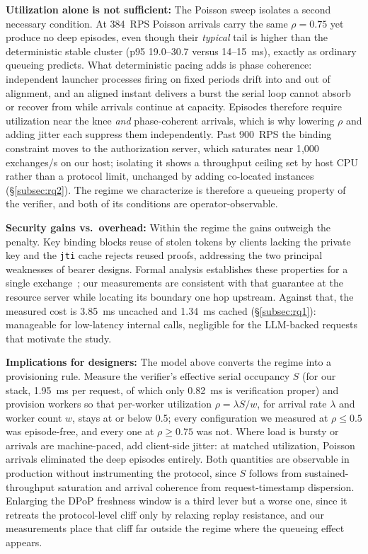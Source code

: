 \documentclass[conference]{IEEEtran}
\begin{document}
\textbf{Utilization alone is not sufficient:}
The Poisson sweep isolates a second necessary condition. At 384~RPS Poisson arrivals carry the same $\rho = 0.75$ yet produce no deep episodes, even though their \emph{typical} tail is higher than the deterministic stable cluster (p95 19.0--30.7 versus 14--15~ms), exactly as ordinary queueing predicts. What deterministic pacing adds is phase coherence: independent launcher processes firing on fixed periods drift into and out of alignment, and an aligned instant delivers a burst the serial loop cannot absorb or recover from while arrivals continue at capacity. Episodes therefore require utilization near the knee \emph{and} phase-coherent arrivals, which is why lowering $\rho$ and adding jitter each suppress them independently. Past 900~RPS the binding constraint moves to the authorization server, which saturates near 1{,}000 exchanges/s on our host; isolating it shows a throughput ceiling set by host CPU rather than a protocol limit, unchanged by adding co-located instances (\S\ref{subsec:rq2}). The regime we characterize is therefore a queueing property of the verifier, and both of its conditions are operator-observable.

\textbf{Security gains vs.\ overhead:}
Within the regime the gains outweigh the penalty. Key binding blocks reuse of stolen tokens by clients lacking the private key and the \texttt{jti} cache rejects reused proofs, addressing the two principal weaknesses of bearer designs. Formal analysis establishes these properties for a single exchange~\cite{fapi2_formal,rfc9449}; our measurements are consistent with that guarantee at the resource server while locating its boundary one hop upstream. Against that, the measured cost is 3.85~ms uncached and 1.34~ms cached (\S\ref{subsec:rq1}): manageable for low-latency internal calls, negligible for the LLM-backed requests that motivate the study.

\textbf{Implications for designers:}
The model above converts the regime into a provisioning rule. Measure the verifier's effective serial occupancy $S$ (for our stack, 1.95~ms per request, of which only 0.82~ms is verification proper) and provision workers so that per-worker utilization $\rho = \lambda S / w$, for arrival rate $\lambda$ and worker count $w$, stays at or below 0.5; every configuration we measured at $\rho \le 0.5$ was episode-free, and every one at $\rho \ge 0.75$ was not. Where load is bursty or arrivals are machine-paced, add client-side jitter: at matched utilization, Poisson arrivals eliminated the deep episodes entirely. Both quantities are observable in production without instrumenting the protocol, since $S$ follows from sustained-throughput saturation and arrival coherence from request-timestamp dispersion. Enlarging the DPoP freshness window is a third lever but a worse one, since it retreats the protocol-level cliff only by relaxing replay resistance, and our measurements place that cliff far outside the regime where the queueing effect appears.
\end{document}
